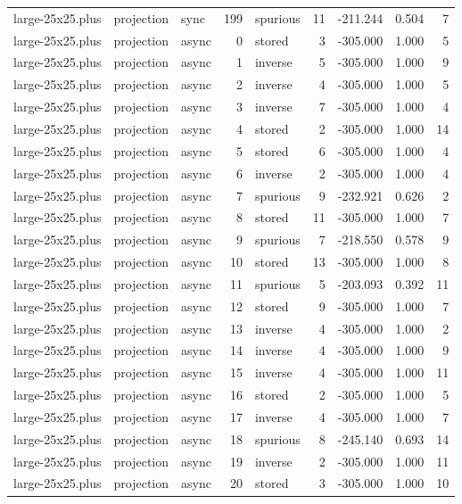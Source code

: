\begin{tabular}{lllrlrrrr}
large-25x25.plus & projection & sync & 199 & spurious & 11 & -211.244 & 0.504 & 7 \\
large-25x25.plus & projection & async & 0 & stored & 3 & -305.000 & 1.000 & 5 \\
large-25x25.plus & projection & async & 1 & inverse & 5 & -305.000 & 1.000 & 9 \\
large-25x25.plus & projection & async & 2 & inverse & 4 & -305.000 & 1.000 & 5 \\
large-25x25.plus & projection & async & 3 & inverse & 7 & -305.000 & 1.000 & 4 \\
large-25x25.plus & projection & async & 4 & stored & 2 & -305.000 & 1.000 & 14 \\
large-25x25.plus & projection & async & 5 & stored & 6 & -305.000 & 1.000 & 4 \\
large-25x25.plus & projection & async & 6 & inverse & 2 & -305.000 & 1.000 & 4 \\
large-25x25.plus & projection & async & 7 & spurious & 9 & -232.921 & 0.626 & 2 \\
large-25x25.plus & projection & async & 8 & stored & 11 & -305.000 & 1.000 & 7 \\
large-25x25.plus & projection & async & 9 & spurious & 7 & -218.550 & 0.578 & 9 \\
large-25x25.plus & projection & async & 10 & stored & 13 & -305.000 & 1.000 & 8 \\
large-25x25.plus & projection & async & 11 & spurious & 5 & -203.093 & 0.392 & 11 \\
large-25x25.plus & projection & async & 12 & stored & 9 & -305.000 & 1.000 & 7 \\
large-25x25.plus & projection & async & 13 & inverse & 4 & -305.000 & 1.000 & 2 \\
large-25x25.plus & projection & async & 14 & inverse & 4 & -305.000 & 1.000 & 9 \\
large-25x25.plus & projection & async & 15 & inverse & 4 & -305.000 & 1.000 & 11 \\
large-25x25.plus & projection & async & 16 & stored & 2 & -305.000 & 1.000 & 5 \\
large-25x25.plus & projection & async & 17 & inverse & 4 & -305.000 & 1.000 & 7 \\
large-25x25.plus & projection & async & 18 & spurious & 8 & -245.140 & 0.693 & 14 \\
large-25x25.plus & projection & async & 19 & inverse & 2 & -305.000 & 1.000 & 11 \\
large-25x25.plus & projection & async & 20 & stored & 3 & -305.000 & 1.000 & 10 \\

\end{tabular}
